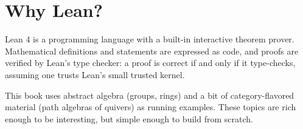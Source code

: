 \section{Why Lean?}\label{sec:00-setup:01-why-lean:1}

Lean 4 is a programming language with a built-in interactive theorem prover. Mathematical definitions and statements are expressed as code, and proofs are verified by Lean's type checker: a proof is correct if and only if it type-checks, assuming one trusts Lean's small trusted kernel.

This book uses abstract algebra (groups, rings) and a bit of category-flavored material (path algebras of quivers) as running examples. These topics are rich enough to be interesting, but simple enough to build from scratch.
